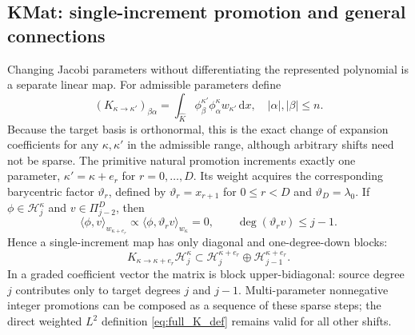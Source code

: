 \documentclass[11pt]{article}
\begin{document}
\subsection{KMat: single-increment promotion and general connections}
\label{sec:full_kmat}
Changing Jacobi parameters without differentiating the represented
polynomial is a separate linear map.  For admissible parameters define
\begin{equation}\label{eq:full_K_def}
 (K_{\kappa\to\kappa'})_{\beta\alpha}
 =\int_{\widehat K}\phi_\beta^{\kappa'}
            \phi_\alpha^\kappa w_{\kappa'}\,\mathrm dx,
 \quad |\alpha|,|\beta|\le n.
\end{equation}
Because the target basis is orthonormal, this is the exact change
of expansion coefficients for any $\kappa,\kappa'$ in the admissible
range, although arbitrary shifts need not be sparse.  The primitive
natural promotion increments exactly one parameter,
$\kappa'=\kappa+e_r$ for $r=0,\ldots,D$.  Its weight acquires the
corresponding barycentric factor $\vartheta_r$, defined by
$\vartheta_r=x_{r+1}$ for $0\le r<D$ and $\vartheta_D=\lambda_0$.
If $\phi\in\mathcal H_j^\kappa$ and $v\in\Pi_{j-2}^D$, then
\begin{equation}\label{eq:full_K_degree_proof}
 \langle\phi,v\rangle_{w_{\kappa+e_r}}
 \propto\langle\phi,\vartheta_r v\rangle_{w_\kappa}=0,
 \qquad\deg(\vartheta_r v)\le j-1.
\end{equation}
Hence a single-increment map has only diagonal and one-degree-down
blocks:
\begin{equation}\label{eq:full_K_bands}
 K_{\kappa\to\kappa+e_r}\mathcal H_j^\kappa
 \subset\mathcal H_j^{\kappa+e_r}
 \oplus\mathcal H_{j-1}^{\kappa+e_r}.
\end{equation}
In a graded coefficient vector the matrix is block upper-bidiagonal:
source degree $j$ contributes only to target degrees $j$ and $j-1$.
Multi-parameter nonnegative integer promotions can be composed as a
sequence of these sparse steps; the direct weighted $L^2$ definition
\eqref{eq:full_K_def} remains valid for all other shifts.
\end{document}
